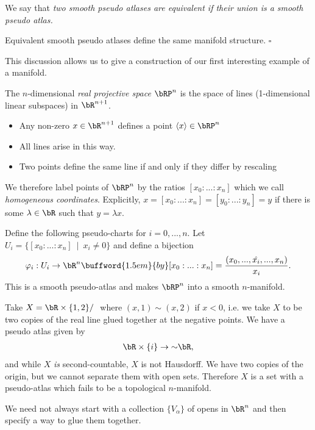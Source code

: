 We say that \emph{two smooth pseudo atlases are equivalent if their union is a smooth pseudo atlas.}
\begin{lem}\label{lem:equiv-pseudo-atlases}
	Equivalent smooth pseudo atlases define the same manifold structure. \hfill $\square$
\end{lem}
This discussion allows us to give a construction of our first interesting example of a manifold.
\begin{example}\label{expl:proj-space}
	The $n$-dimensional \emph{real projective space} $\bRP^n$ is the space of lines (1-dimensional linear subspaces) in $\bR^{n+1}$.
	\begin{itemize}
		\item Any non-zero $x \in \bR^{n+1}$ defines a point $\langle x \rangle \in \bRP^n$
		\item All lines arise in this way.
		\item Two points define the same line if and only if they differ by rescaling
	\end{itemize}
	We therefore label points of $\bRP^n$ by the ratios $[x_0:...:x_n]$ which we call \emph{homogeneous coordinates}. Explicitly, $x = [x_0:...:x_n] = [y_0:...:y_n] = y$ if there is some $\lambda \in \bR$ such that $y = \lambda x$.
\end{example}
Define the following pseudo-charts for $i = 0,...,n$. Let $U_i = \{[x_0:...:x_n] ~\mid~ x_i \neq 0\}$ and define a bijection
\begin{align*}
	\varphi_i:U_i \to \bR^n \buffword{1.5em}{by} [x_0:...:x_n] = \frac{(x_0,...,\hat{x_i},...,x_n)}{x_i}.
\end{align*}
This is a smooth pseudo-atlas and makes $\bRP^n$ into a smooth $n$-manifold.

\begin{example}\label{expl:pseudo-atlas-not-second-countable}
	Take $X = \bR \times \{1,2\} / ~$ where $(x,1) \sim (x,2)$ if $x < 0$, i.e. we take $X$ to be two copies of the real line glued together at the negative points. We have a pseudo atlas given by
	\begin{align*}
		\bR\times \{i\} \to{\sim} \bR,
	\end{align*}
	and while $X$ \emph{is} second-countable, $X$ is not Hausdorff. We have two copies of the origin, but we cannot separate them with open sets. Therefore $X$ is a set with a pseudo-atlas which fails to be a topological $n$-manifold.
\end{example}

\begin{rmk}\label{rmk:pseudo-atlas-constructions-alt-approach}
	We need not always start with a collection $\{V_\alpha\}$ of opens in $\bR^n$ and then specify a way to glue them together.
\end{rmk}

